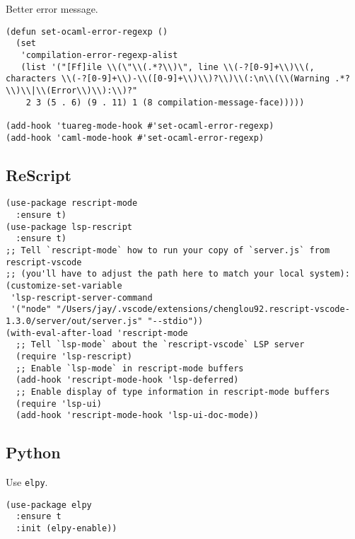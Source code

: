 \documentclass[a4paper,11pt]{article}
\begin{document}
Better error message.
\begin{verbatim}
(defun set-ocaml-error-regexp ()
  (set
   'compilation-error-regexp-alist
   (list '("[Ff]ile \\(\"\\(.*?\\)\", line \\(-?[0-9]+\\)\\(, characters \\(-?[0-9]+\\)-\\([0-9]+\\)\\)?\\)\\(:\n\\(\\(Warning .*?\\)\\|\\(Error\\)\\):\\)?"
    2 3 (5 . 6) (9 . 11) 1 (8 compilation-message-face)))))

(add-hook 'tuareg-mode-hook #'set-ocaml-error-regexp)
(add-hook 'caml-mode-hook #'set-ocaml-error-regexp)
\end{verbatim}

\subsection{ReScript}
\label{sec:orga6d4f3b}
\begin{verbatim}
(use-package rescript-mode
  :ensure t)
(use-package lsp-rescript
  :ensure t)
;; Tell `rescript-mode` how to run your copy of `server.js` from rescript-vscode
;; (you'll have to adjust the path here to match your local system):
(customize-set-variable
 'lsp-rescript-server-command
 '("node" "/Users/jay/.vscode/extensions/chenglou92.rescript-vscode-1.3.0/server/out/server.js" "--stdio"))
(with-eval-after-load 'rescript-mode
  ;; Tell `lsp-mode` about the `rescript-vscode` LSP server
  (require 'lsp-rescript)
  ;; Enable `lsp-mode` in rescript-mode buffers
  (add-hook 'rescript-mode-hook 'lsp-deferred)
  ;; Enable display of type information in rescript-mode buffers
  (require 'lsp-ui)
  (add-hook 'rescript-mode-hook 'lsp-ui-doc-mode))
\end{verbatim}

\subsection{Python}
\label{sec:org51d7e21}
Use \texttt{elpy}.
\begin{verbatim}
(use-package elpy
  :ensure t
  :init (elpy-enable))
\end{verbatim}
\end{document}
